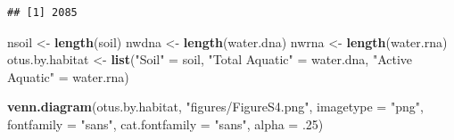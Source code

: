 \documentclass[]{article}
\newenvironment{Shaded}{\begin{snugshade}}{\end{snugshade}}
\newcommand{\DataTypeTok}[1]{\textcolor[rgb]{0.13,0.29,0.53}{#1}}
\newcommand{\DecValTok}[1]{\textcolor[rgb]{0.00,0.00,0.81}{#1}}
\newcommand{\FloatTok}[1]{\textcolor[rgb]{0.00,0.00,0.81}{#1}}
\newcommand{\KeywordTok}[1]{\textcolor[rgb]{0.13,0.29,0.53}{\textbf{#1}}}
\newcommand{\NormalTok}[1]{#1}
\newcommand{\OperatorTok}[1]{\textcolor[rgb]{0.81,0.36,0.00}{\textbf{#1}}}
\newcommand{\StringTok}[1]{\textcolor[rgb]{0.31,0.60,0.02}{#1}}
\begin{document}
\begin{Shaded}
\end{Shaded}

\begin{verbatim}
## [1] 2085
\end{verbatim}

\begin{Shaded}
\begin{Highlighting}[]
\NormalTok{nsoil <-}\StringTok{ }\KeywordTok{length}\NormalTok{(soil)}
\NormalTok{nwdna <-}\StringTok{ }\KeywordTok{length}\NormalTok{(water.dna)}
\NormalTok{nwrna <-}\StringTok{ }\KeywordTok{length}\NormalTok{(water.rna)}
\NormalTok{otus.by.habitat <-}\StringTok{ }\KeywordTok{list}\NormalTok{(}\StringTok{"Soil"}\NormalTok{ =}\StringTok{ }\NormalTok{soil, }\StringTok{"Total Aquatic"}\NormalTok{ =}\StringTok{ }\NormalTok{water.dna, }\StringTok{"Active Aquatic"}\NormalTok{ =}\StringTok{ }\NormalTok{water.rna)}

\KeywordTok{venn.diagram}\NormalTok{(otus.by.habitat, }\StringTok{"figures/FigureS4.png"}\NormalTok{, }
             \DataTypeTok{imagetype =} \StringTok{"png"}\NormalTok{, }
             \DataTypeTok{fontfamily =} \StringTok{"sans"}\NormalTok{, }
             \DataTypeTok{cat.fontfamily =} \StringTok{"sans"}\NormalTok{,}
             \DataTypeTok{alpha =} \FloatTok{.25}\NormalTok{)}
\end{Highlighting}
\end{Shaded}
\end{document}
